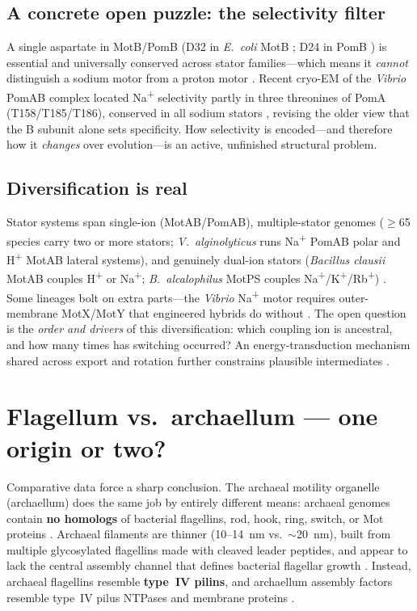 \documentclass[11pt,letterpaper]{article}
\begin{document}
\subsection{A concrete open puzzle: the selectivity filter}
A single aspartate in MotB/PomB (D32 in \emph{E.\ coli} MotB \cite{Sowa-2008}; D24 in PomB
\cite{Hu-2023}) is essential and universally conserved across stator families---which
means it \emph{cannot} distinguish a sodium motor from a proton motor \cite{Hu-2023}.
Recent cryo-EM of the \emph{Vibrio} PomAB complex located Na\textsuperscript{+} selectivity partly in
three threonines of PomA (T158/T185/T186), conserved in all sodium stators \cite{Hu-2023},
revising the older view that the B subunit alone sets specificity. How selectivity is encoded---and
therefore how it \emph{changes} over evolution---is an active, unfinished structural problem.

\subsection{Diversification is real}
Stator systems span single-ion (MotAB/PomAB), multiple-stator genomes ($\ge$65 species carry two or
more stators; \emph{V.\ alginolyticus} runs Na\textsuperscript{+} PomAB polar and
H\textsuperscript{+} MotAB lateral systems), and genuinely dual-ion stators (\emph{Bacillus clausii}
MotAB couples H\textsuperscript{+} or Na\textsuperscript{+}; \emph{B.\ alcalophilus} MotPS couples
Na\textsuperscript{+}/K\textsuperscript{+}/Rb\textsuperscript{+}) \cite{Sowa-2008}. Some
lineages bolt on extra parts---the \emph{Vibrio} Na\textsuperscript{+} motor requires outer-membrane
MotX/MotY that engineered hybrids do without \cite{Yakushi-2006,Jaques-1999}. The open
question is the \emph{order and drivers} of this diversification: which coupling ion is ancestral, and
how many times has switching occurred? An energy-transduction mechanism shared across export and
rotation further constrains plausible intermediates \cite{Minamino-2011}.

\section{Flagellum vs.\ archaellum --- one origin or two?}
Comparative data force a sharp conclusion. The archaeal motility organelle (archaellum) does the same
job by entirely different means: archaeal genomes contain \textbf{no homologs} of bacterial flagellins,
rod, hook, ring, switch, or Mot proteins \cite{Thomas-2001}. Archaeal filaments are thinner
(10--14~nm vs.\ $\sim$20~nm), built from multiple glycosylated flagellins made with cleaved leader
peptides, and appear to lack the central assembly channel that defines bacterial flagellar growth
\cite{Thomas-2001,Thomas-2002}. Instead, archaeal flagellins resemble \textbf{type~IV
pilins}, and archaellum assembly factors resemble type~IV pilus NTPases and membrane proteins
\cite{Thomas-2002}.
\end{document}
